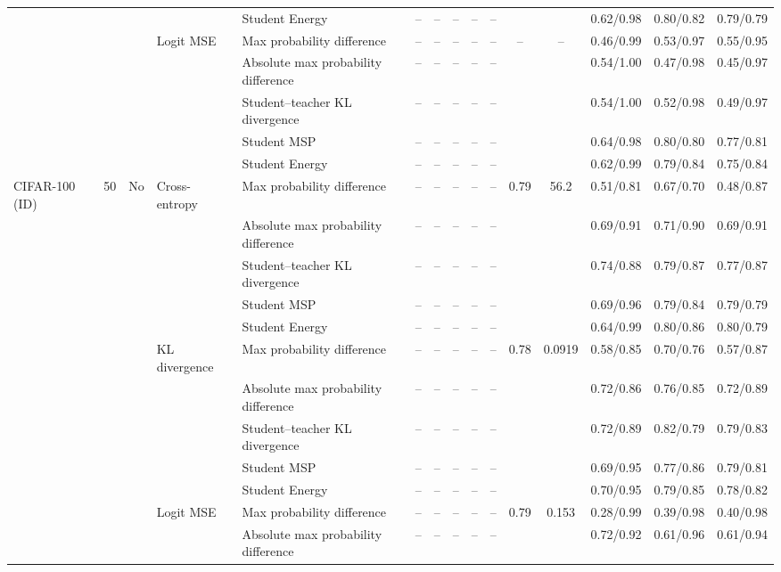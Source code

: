 \documentclass[border=2pt]{standalone}
\begin{document}
\begin{tabular}{lllllcccccccccc}
 &  &  &  & Student Energy & -- & -- & -- & -- & -- &  &  & 0.62/0.98 & 0.80/0.82 & 0.79/0.79 \\
 &  &  & Logit MSE & Max probability difference & -- & -- & -- & -- & -- & -- & -- & 0.46/0.99 & 0.53/0.97 & 0.55/0.95 \\
 &  &  &  & Absolute max probability difference & -- & -- & -- & -- & -- &  &  & 0.54/1.00 & 0.47/0.98 & 0.45/0.97 \\
 &  &  &  & Student--teacher KL divergence & -- & -- & -- & -- & -- &  &  & 0.54/1.00 & 0.52/0.98 & 0.49/0.97 \\
 &  &  &  & Student MSP & -- & -- & -- & -- & -- &  &  & 0.64/0.98 & 0.80/0.80 & 0.77/0.81 \\
 &  &  &  & Student Energy & -- & -- & -- & -- & -- &  &  & 0.62/0.99 & 0.79/0.84 & 0.75/0.84 \\
\addlinespace
CIFAR-100 (ID) & 50 & No & Cross-entropy & Max probability difference & -- & -- & -- & -- & -- & 0.79 & 56.2 & 0.51/0.81 & 0.67/0.70 & 0.48/0.87 \\
 &  &  &  & Absolute max probability difference & -- & -- & -- & -- & -- &  &  & 0.69/0.91 & 0.71/0.90 & 0.69/0.91 \\
 &  &  &  & Student--teacher KL divergence & -- & -- & -- & -- & -- &  &  & 0.74/0.88 & 0.79/0.87 & 0.77/0.87 \\
 &  &  &  & Student MSP & -- & -- & -- & -- & -- &  &  & 0.69/0.96 & 0.79/0.84 & 0.79/0.79 \\
 &  &  &  & Student Energy & -- & -- & -- & -- & -- &  &  & 0.64/0.99 & 0.80/0.86 & 0.80/0.79 \\
 &  &  & KL divergence & Max probability difference & -- & -- & -- & -- & -- & 0.78 & 0.0919 & 0.58/0.85 & 0.70/0.76 & 0.57/0.87 \\
 &  &  &  & Absolute max probability difference & -- & -- & -- & -- & -- &  &  & 0.72/0.86 & 0.76/0.85 & 0.72/0.89 \\
 &  &  &  & Student--teacher KL divergence & -- & -- & -- & -- & -- &  &  & 0.72/0.89 & 0.82/0.79 & 0.79/0.83 \\
 &  &  &  & Student MSP & -- & -- & -- & -- & -- &  &  & 0.69/0.95 & 0.77/0.86 & 0.79/0.81 \\
 &  &  &  & Student Energy & -- & -- & -- & -- & -- &  &  & 0.70/0.95 & 0.79/0.85 & 0.78/0.82 \\
 &  &  & Logit MSE & Max probability difference & -- & -- & -- & -- & -- & 0.79 & 0.153 & 0.28/0.99 & 0.39/0.98 & 0.40/0.98 \\
 &  &  &  & Absolute max probability difference & -- & -- & -- & -- & -- &  &  & 0.72/0.92 & 0.61/0.96 & 0.61/0.94 \\

\end{tabular}
\end{document}
